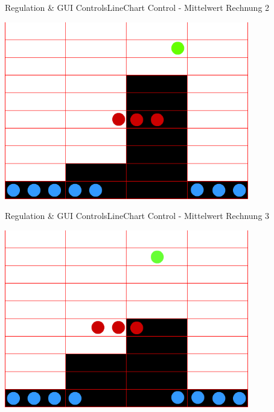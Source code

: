 	\begin{frame}{Regulation \& GUI Controls}{LineChart Control - Mittelwert Rechnung 2}
	\begin{center}			
		\includegraphics[width=0.8\textwidth]{../regulation/TooManySamples020002.png}
	\end{center}
	\end{frame}
	
	\begin{frame}{Regulation \& GUI Controls}{LineChart Control - Mittelwert Rechnung 3}
	\begin{center}			
		\includegraphics[width=0.8\textwidth]{../regulation/TooManySamples020003.png}
	\end{center}
	\end{frame}
	
